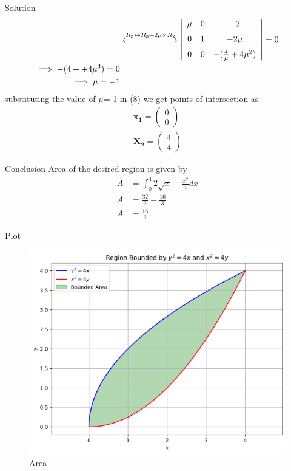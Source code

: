 \documentclass{beamer}
\numberwithin{equation}{section}
\theoremstyle{remark}
\newcommand{\myvec}[1]{\ensuremath{\begin{pmatrix}#1\end{pmatrix}}}
\let\vec\mathbf
\begin{document}
\begin{frame}{Solution}
    \begin{align}
&\xleftrightarrow{R_3 \leftrightarrow R_3 + 2\mu \times R_2} \left|
\begin{array}{ccc}
\mu & 0 & -2 \\[6pt]
0 & 1  & -2\mu \\[6pt]
0 & 0 & -(\frac{4}{\mu} +4 \mu ^2)
\end{array}
\right| =0\\
\implies -(4 + +4 \mu ^3)=0\\
\implies \mu=-1
\end{align}
substituting the value of $\mu$=-1 in (8) we get points of intersection as 
\begin{align}
    \vec{x_1}=\myvec{0\\0} \\
    \vec{X_2}=\myvec{4\\4}
\end{align}
\end{frame}
\begin{frame}{Conclusion}
Area of the desired region is given by
\begin{align}
A &= \int_{0}^{4}2\sqrt{x}-\frac{x^2}{4}dx\\
A &= \frac{32}{3}-\frac{16}{3}\\
A &= \frac{16}{3}
\end{align}
\end{frame}

\begin{frame}{Plot}
    \begin{figure}[h!]
    \centering
    \includegraphics[width=0.7\columnwidth]{figs/01.png}
    \caption{Area}
    \label{fig:placeholder}
\end{figure}
\end{frame}
\end{document}
